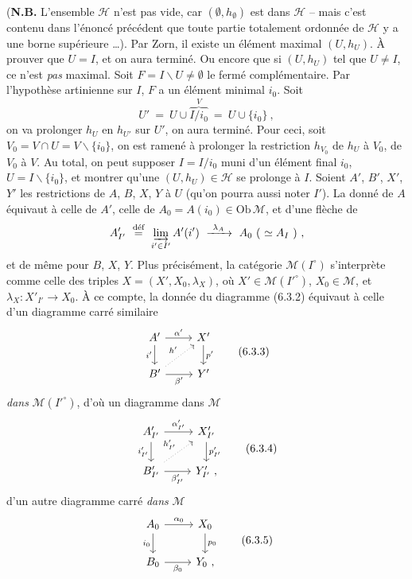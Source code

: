 \documentclass[11pt]{article}
\newcommand{\printedpage}[1]{\marginpar{\footnotesize p.~#1}}
\newcommand{\msp}[1]{\marginpar{\footnotesize [#1]}}
\begin{document}
\printedpage{55}\msp{page 110}
(\textbf{N.B.} L'ensemble $\mathcal{H}$ n'est pas vide, car $(\emptyset, h_{\emptyset})$ est dans $\mathcal{H}$ -- mais c'est contenu dans l'énoncé précédent que toute partie totalement ordonnée de $\mathcal{H}$ y a une borne supérieure \dots). Par Zorn, il existe un élément maximal $(U, h_U)$. À prouver que $U = I$, et on aura terminé. Ou encore que si $(U, h_U)$ tel que $U \neq I$, ce n'est \textit{pas} maximal. Soit $F = I\backslash U \neq \emptyset$ le fermé complémentaire. Par l'hypothèse artinienne sur $I$, $F$ a un élément minimal $i_0$. Soit
\[
U' \ =\ U \cup \overbrace{I/i_0}^{V} \ =\ U \cup \{i_0\}\ ,
\]
on va prolonger $h_U$ en $h_{U'}$ sur $U'$, on aura terminé. Pour ceci, soit $V_0 = V \cap U = V\backslash\{i_0\}$, on est ramené à prolonger la restriction $h_{V_0}$ de $h_U$ à $V_0$, de $V_0$ à $V$. Au total, on peut supposer $I = I/i_0$ muni d'un élément final $i_0$, $U = I\backslash\{i_0\}$, et montrer qu'une $(U, h_U) \in \mathcal{H}$ se prolonge à $I$. Soient $A'$, $B'$, $X'$, $Y'$ les restrictions de $A$, $B$, $X$, $Y$ à $U$ (qu'on pourra aussi noter $I'$). La donné de $A$ %
équivaut à celle de $A'$, celle de $A_0 = A(i_0) \in \mathrm{Ob}\,\mathcal{M}$, et d'une flèche de
\[
A'_{I'} \ \overset{\text{déf}}{=}\ \varinjlim\limits_{i' \in I'} A'(i') \ \xrightarrow{\ \lambda_A\ }\ A_0\ (\ \simeq A_I\ )\ ,
\]
\msp{page 111}et de même pour $B$, $X$, $Y$. Plus précisément, la catégorie $\mathcal{M}(I^{\circ})$ s'interprète comme celle des triples $X = (X', X_0, \lambda_X)$, où $X' \in \mathcal{M}(I'^{\circ})$, $X_0 \in \mathcal{M}$, et $\lambda_X : X'_{I'} \longrightarrow X_0$. À ce compte, la donnée du diagramme (6.3.2) équivaut à celle d'un diagramme carré similaire
\[
\begin{tikzcd}
A' \arrow[r, "\alpha'"] \arrow[d, "i'"'] & X' \arrow[d, "p'"] \\
B' \arrow[r, "\beta'"'] \arrow[ur, dotted, "h'"] & Y'
\end{tikzcd}
\tag*{(6.3.3)}
\]
\textit{dans} $\mathcal{M}(I'^{\circ})$, d'où un diagramme dans $\mathcal{M}$
\[
\begin{tikzcd}
A'_{I'} \arrow[r, "\alpha'_{I'}"] \arrow[d, "i'_{I'}"'] & X'_{I'} \arrow[d, "p'_{I'}"] \\
B'_{I'} \arrow[r, "\beta'_{I'}"'] \arrow[ur, dotted, "h'_{I'}"] & Y'_{I'}\ ,
\end{tikzcd}
\tag*{(6.3.4)}
\]
d'un autre diagramme carré \textit{dans} $\mathcal{M}$
\[
\begin{tikzcd}
A_0 \arrow[r, "\alpha_0"] \arrow[d, "i_0"'] & X_0 \arrow[d, "p_0"] \\
B_0 \arrow[r, "\beta_0"'] & Y_0\ ,
\end{tikzcd}
\tag*{(6.3.5)}
\]
\end{document}
